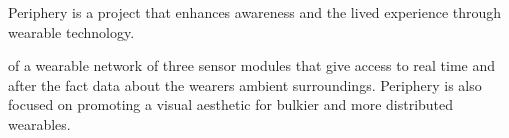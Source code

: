 
Periphery is a project that enhances awareness and the lived experience through wearable technology.

 of a wearable network of three sensor modules that give access to real time and after the fact data about the wearers ambient surroundings. Periphery is also focused on promoting a visual aesthetic for bulkier and more distributed wearables.